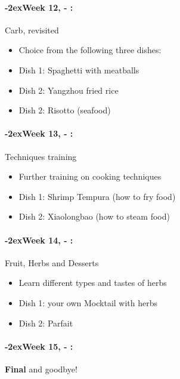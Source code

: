 \documentclass[11pt]{article}
\newcommand{\week}[1]{%
  \paragraph*{\kern-2ex\quad #1, \syldate{\today} - \AdvanceDate[4]\syldate{\today}:}%
  \ifdim\wd1=\wd\MONDAY
    \AdvanceDate[7]
  \else
    \AdvanceDate[7]
  \fi%
}
\begin{document}
\week{Week 12} Carb, revisited
\begin{itemize}
\item Choice from the following three dishes: 
\item Dish 1: Spaghetti with meatballs
\item Dish 2: Yangzhou fried rice
\item Dish 2: Risotto (seafood)
\end{itemize}

\week{Week 13} Techniques training 
\begin{itemize}
\item Further training on cooking techniques 
\item Dish 1: Shrimp Tempura (how to fry food)
\item Dish 2: Xiaolongbao (how to steam food)
\end{itemize}

\week{Week 14} Fruit, Herbs and Desserts 
\begin{itemize}
\item Learn different types and tastes of herbs
\item Dish 1: your own Mocktail with herbs
\item Dish 2: Parfait 
\end{itemize}

\week{Week 15} \textbf{Final} and goodbye!
\end{document}

